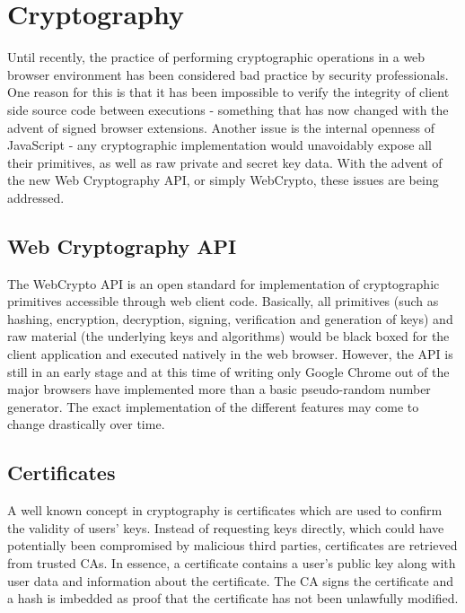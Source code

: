 \section{Cryptography}
Until recently, the practice of performing cryptographic operations in a web browser environment has been considered bad practice by security professionals\cite{Matasano:Online}. One reason for this is that it has been impossible to verify the integrity of client side source code between executions - something that has now changed with the advent of signed browser extensions. Another issue is the internal openness of JavaScript - any cryptographic implementation would unavoidably expose all their primitives, as well as raw private and secret key data. With the advent of the new Web Cryptography API, or simply WebCrypto, these issues are being addressed\cite{WebCrypto:Online}.

\subsection{Web Cryptography API}
The WebCrypto API is an open standard for implementation of cryptographic primitives accessible through web client code\cite{WebCrypto:Online}. Basically, all primitives (such as hashing, encryption, decryption, signing, verification and generation of keys) and raw material (the underlying keys and algorithms) would be black boxed for the client application and executed natively in the web browser. However, the API is still in an early stage and at this time of writing only Google Chrome out of the major browsers have implemented more than a basic pseudo-random number generator. The exact implementation of the different features may come to change drastically over time.

\subsection{Certificates}
A well known concept in cryptography is certificates which are used to confirm the validity of users' keys\cite{EETimesCrypto:Online}. Instead of requesting keys directly, which could have potentially been compromised by malicious third parties, certificates are retrieved from trusted CAs. In essence, a certificate contains a user's public key along with user data and information about the certificate. The CA signs the certificate and a hash is imbedded as proof that the certificate has not been unlawfully modified.

